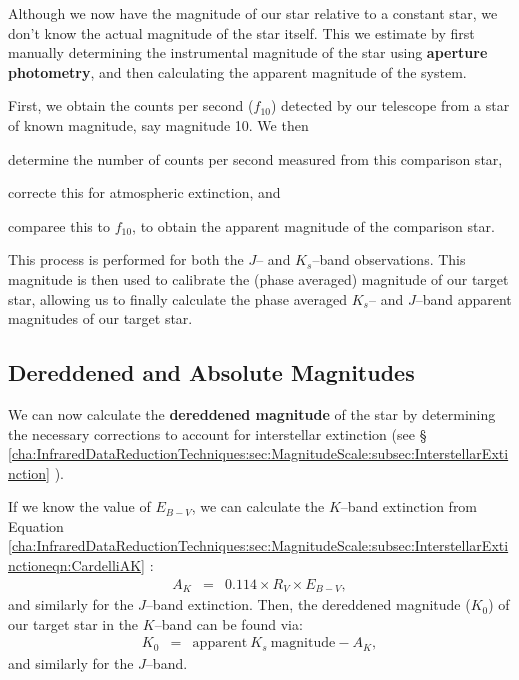 Although we now have the magnitude of our star relative to a constant
star, we don't know the actual magnitude of the star itself. This we
estimate by first manually determining the instrumental magnitude of the
star using \textbf{aperture photometry}, and then calculating the apparent magnitude of the system. %

\vspace{\myparskip}

First, we obtain the counts per second ($f_{10}$) detected by our
telescope from a star of known magnitude, say magnitude 10. We then
\begin{inparaenum}[(i)]
\item determine the number of counts per second measured from this comparison star,
\item correcte this for atmospheric extinction, and
\item comparee this to $f_{10}$, to obtain the apparent magnitude of the comparison star.
\end{inparaenum}

\vspace{\myparskip}

This process is performed for both the $J$-- and $K_{s}$--band observations. This magnitude is then used to calibrate the (phase averaged) magnitude of our target star, allowing us to finally calculate the phase averaged $K_{s}$-- and $J$--band apparent magnitudes of our target star. %


\subsection{Dereddened and Absolute Magnitudes}
\label{cha:InfraredDataReductionTechniques:sec:Photometry:subsec:DereddenedMagnitude}

We can now calculate the \textbf{dereddened magnitude} of the star by
determining the necessary corrections to account for interstellar
extinction (see \S~%
\vref{cha:InfraredDataReductionTechniques:sec:MagnitudeScale:subsec:InterstellarExtinction}%
). %

\vspace{\myparskip}

If we know the value of $E_{B-V}$, we can calculate the $K$--band extinction from Equation~%
\vref{cha:InfraredDataReductionTechniques:sec:MagnitudeScale:subsec:InterstellarExtinctioneqn:CardelliAK}%
: %
\begin{eqnarray}
\label{cha:InfraredDataReductionTechniques:sec:Photometry:subsec:DereddenedMagnitude:eqn:CardelliAK}
A_{K}    & = & 0.114 \times R_V \times E_{B-V}, \nonumber
\end{eqnarray}
and similarly for the $J$--band extinction. Then, the dereddened
magnitude ($K_{0}$) of our target star in the $K$--band can be found via:
\begin{eqnarray}
\label{cha:InfraredDataReductionTechniques:sec:Photometry:subsec:DereddenedMagnitude:eqn:K0}
K_0 & = & \mathrm{apparent\ } K_{s} \mathrm{\ magnitude} - A_K,
\end{eqnarray}
and similarly for the $J$--band. %

